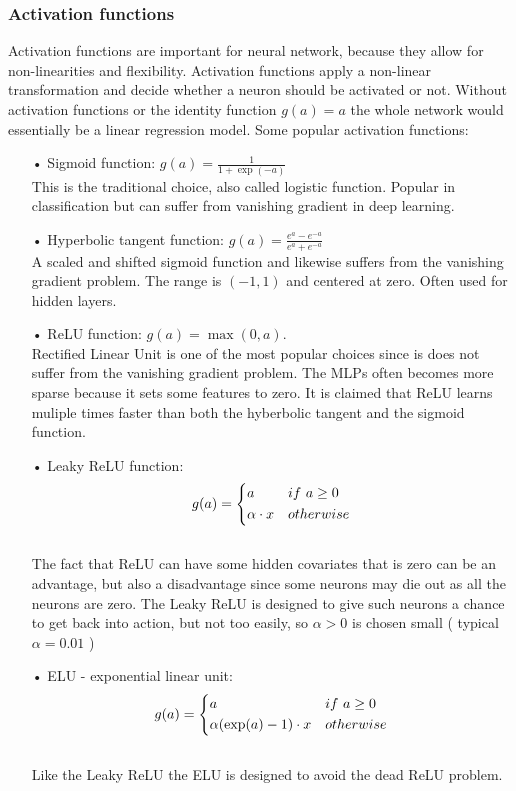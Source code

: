 \subsubsection{Activation functions}
Activation functions are important for neural network, because they allow for non-linearities and flexibility. Activation functions apply a non-linear transformation and decide whether a neuron should be activated or not. Without activation functions or the identity function $g(a)=a$ the whole network would essentially be a linear regression model. Some popular activation functions:
\begin{enumerate}
\item[•] Sigmoid function: $g(a)=\frac{1}{1+\exp(-a)}$\\

This is the traditional choice, also called logistic function. Popular in classification but can suffer from vanishing gradient in deep learning.
\item[•] Hyperbolic tangent function: $g(a)=\frac{e^a-e^{-a}}{e^a+e^{-a}}$\\

A scaled and shifted sigmoid function and likewise suffers from the vanishing gradient problem. The range is $(-1,1)$ and centered at zero. Often used for hidden layers.
\item[•] ReLU function: $g(a)=\max(0,a)$.\\

Rectified Linear Unit is one of the most popular choices since is does not suffer from the vanishing gradient problem. The MLPs often becomes more sparse because it sets some features to zero. It is claimed that ReLU learns muliple times faster than both the hyberbolic tangent and the sigmoid function.
\item[•] Leaky ReLU function:  \[ g(a)=
    \begin{dcases}
        a & if \ a \geq 0 \\
        \alpha \cdot x & otherwise \\
    \end{dcases}
\]\\
The fact that ReLU can have some hidden covariates that is zero can be an advantage, but also a disadvantage since some neurons may die out as all the neurons are zero. The Leaky ReLU is designed to give such neurons a chance to get back into action, but not too easily, so $\alpha>0$ is chosen small ( typical $\alpha=0.01$ ) 

\item[•] ELU - exponential linear unit:  \[ g(a)=
    \begin{dcases}
        a & if \ a \geq 0 \\
        \alpha(\exp(a)-1) \cdot x & otherwise \\
    \end{dcases}
\]\\
Like the Leaky ReLU the ELU is designed to avoid the dead ReLU problem. 
\end{enumerate}


